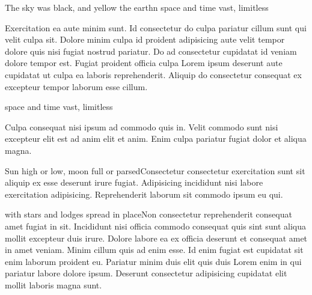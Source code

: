




\vspace{\myLineheight}\begin{multicols}{2}\raggedcolumns{}

\end{multicols}


{\mktsHOne{}\cjkgGlue{} The sky was black, and yellow the earthn\cjkgGlue{} space and time vast, limitless\mktsHOneBEG}

\vspace{\myLineheight}\begin{multicols}{2}\raggedcolumns{}Exercitation ea aute minim sunt. Id consectetur do culpa pariatur cillum sunt qui velit culpa sit. Dolore minim culpa id proident adipisicing aute velit tempor dolore quis nisi fugiat nostrud pariatur. Do ad consectetur cupidatat id veniam dolore tempor est. Fugiat proident officia culpa Lorem ipsum deserunt aute cupidatat ut culpa ea laboris reprehenderit. Aliquip do consectetur consequat ex excepteur tempor laborum esse cillum.



\end{multicols}


{\mktsHTwo{}\cjkgGlue{} space and time vast, limitless\mktsHTwoBEG}

\vspace{\myLineheight}\begin{multicols}{2}\raggedcolumns{}Culpa consequat nisi ipsum ad commodo quis in. Velit commodo sunt nisi excepteur elit est ad anim elit et anim. Enim culpa pariatur fugiat dolor et aliqua magna.




{\mktsHThree{}\cjkgGlue{} Sun high or low, moon full or parsed\mktsHThreeBEG}Consectetur consectetur exercitation sunt sit aliquip ex esse deserunt irure fugiat. Adipisicing incididunt nisi labore exercitation adipisicing. Reprehenderit laborum sit commodo ipsum eu qui.




{\mktsHThree{}\cjkgGlue{} with stars and lodges spread in place\mktsHThreeBEG}Non consectetur reprehenderit consequat amet fugiat in sit. Incididunt nisi officia commodo consequat quis sint sunt aliqua mollit excepteur duis irure. Dolore labore ea ex officia deserunt et consequat amet in amet veniam. Minim cillum quis ad enim esse. Id enim fugiat est cupidatat sit enim laborum proident eu. Pariatur minim duis elit quis duis Lorem enim in qui pariatur labore dolore ipsum. Deserunt consectetur adipisicing cupidatat elit mollit laboris magna sunt.



\end{multicols}


